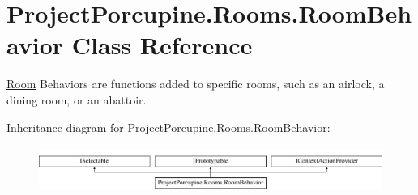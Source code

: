 \hypertarget{class_project_porcupine_1_1_rooms_1_1_room_behavior}{}\section{Project\+Porcupine.\+Rooms.\+Room\+Behavior Class Reference}
\label{class_project_porcupine_1_1_rooms_1_1_room_behavior}


\hyperlink{class_project_porcupine_1_1_rooms_1_1_room}{Room} Behaviors are functions added to specific rooms, such as an airlock, a dining room, or an abattoir.  


Inheritance diagram for Project\+Porcupine.\+Rooms.\+Room\+Behavior\+:\begin{figure}[H]
\begin{center}
\leavevmode
\includegraphics[height=1.523810cm]{class_project_porcupine_1_1_rooms_1_1_room_behavior}
\end{center}
\end{figure}
